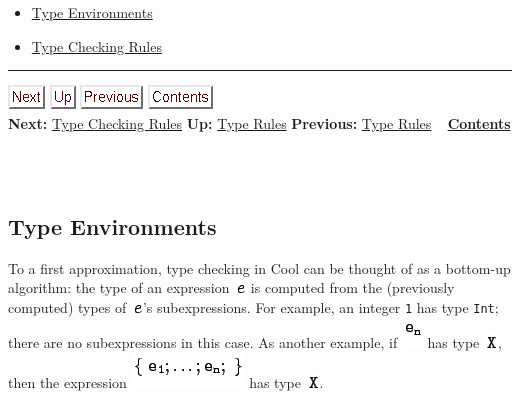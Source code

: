 \documentclass[]{article}
\begin{document}
\begin{itemize}
\itemsep1pt\parskip0pt
\item
  \href{node42.html}{Type Environments}
\item
  \href{node43.html}{Type Checking Rules}
\end{itemize}

\begin{center}\rule{3in}{0.4pt}\end{center}

\href{node43.html}{\includegraphics{next.png}}
\href{node41.html}{\includegraphics{up.png}}
\href{node41.html}{\includegraphics{prev.png}}
\href{node1.html}{\includegraphics{contents.png}} \\ \textbf{Next:}
\href{node43.html}{Type Checking Rules} \textbf{Up:}
\href{node41.html}{Type Rules} \textbf{Previous:}
\href{node41.html}{Type Rules} ~ \textbf{\href{node1.html}{Contents}} \\
\\

\subsection{\\ Type Environments}

To a first approximation, type checking in Cool can be thought of as a
bottom-up algorithm: the type of an expression
\includegraphics{img51.png} is computed from the (previously computed)
types of \includegraphics{img51.png}'s subexpressions. For example, an
integer \texttt{1} has type \texttt{Int}; there are no subexpressions in
this case. As another example, if \includegraphics{img18.png} has type
\includegraphics{img52.png}, then the expression
\includegraphics{img53.png} has type \includegraphics{img52.png}.
\end{document}
